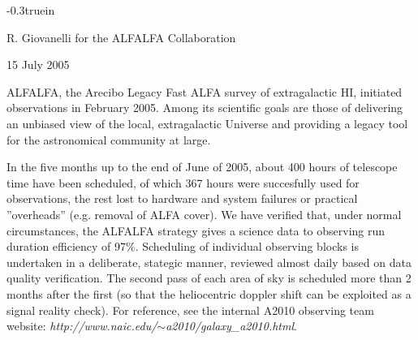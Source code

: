 \def\@tightleading{0.95}
\def\baselinestretch{\@tightleading}\normalsize
\textwidth 6.4in
\textheight 8.8in
\oddsidemargin 0.0in
\evensidemargin 0.0in
\topmargin -0.3truein
\raggedbottom
\parskip 8pt
\parindent 0pt
\def\be{\begin{equation}}
\def\ee{\end{equation}}
\def\etal{{\it et al. }}
\def\kms{km~s$^{-1}$~}
\def\kmsm{km~s$^{-1}$~Mpc$^{-1}$~}
\def\Hnot{H$_\circ$}
\def\dhh{$\Delta H_\circ/H_\circ$}
\def\figwidth{1~}
\def\I{{\cal I}~}
\def\Wopt{W$_{opt}$~}
\def\Whi{W$_{21}$~}
\def\W50{W$_{50}$~}
\def\L{$\cal\char'114$}
\def\M{$\cal\char'115$}
\def\LL{{\cal\char'114}}
\def\MM{{\cal\char'115}}
\def\ts{$T_{sys}$}
\def\plotfiddle#1#2#3#4#5#6#7{{\centering \leavevmode \vbox to#2{\rule{0pt}{#2}}\special{psfile=#1 voffset=#7 hoffset=#6 vscale=#5 hscale=#4 angle=#3}}}


\begin{center}
\end{center}

\centerline {R. Giovanelli for the ALFALFA Collaboration}
\centerline{15 July 2005}


ALFALFA, the Arecibo Legacy Fast ALFA survey of extragalactic HI, initiated
observations in February 2005. Among its scientific goals are those of delivering 
an unbiased view of the local, extragalactic Universe and providing a legacy tool 
for the astronomical community at large.

In the five months up to the end of June of 2005, about 400 hours of telescope
time have been scheduled, of which 367 hours were succesfully used for
observations, the rest lost to hardware and system failures or practical
''overheads'' (e.g. removal of ALFA cover). We have verified that, under
normal circumstances, the ALFALFA strategy gives a science data to observing
run duration efficiency of 97\%. Scheduling of individual observing blocks
is undertaken in a deliberate, stategic manner, reviewed almost daily based
on data quality verification. The second pass of each area of sky is 
scheduled more than 2 months after the first (so that the heliocentric
doppler shift can be exploited as a signal reality check).
For reference, see the internal A2010 observing team website:
{\it http://www.naic.edu/$\sim$a2010/galaxy\_a2010.html}.

